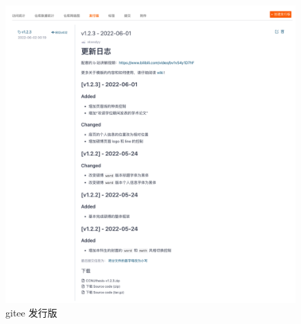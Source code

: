 \documentclass{ccnudoc}
\begin{document}
\begin{figure}[htbp]
  \centering
  \includegraphics[width = \textwidth]{gitee发行版.png}
  \caption{gitee 发行版}
  \label{figure:gitee发行版}
\end{figure}




\end{document}
